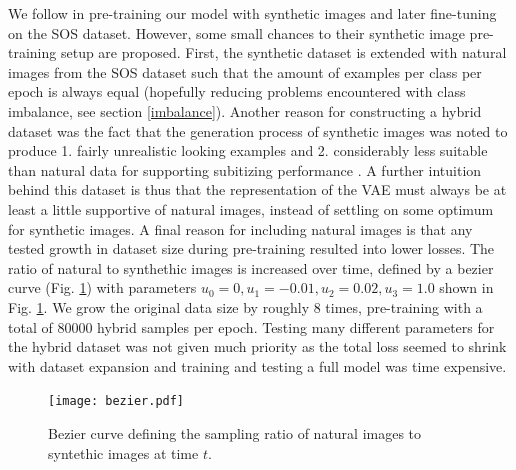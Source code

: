 \documentclass[twocolumn]{article}
\begin{document}
We follow \citet{zhang2016salient} in pre-training our model with
synthetic images and later fine-tuning on the SOS dataset. However, some
small chances to their synthetic image pre-training setup are proposed.
First, the synthetic dataset is extended with natural images from the
SOS dataset such that the amount of examples per class per epoch is
always equal (hopefully reducing problems encountered with class
imbalance, see section \ref{imbalance}). Another
reason for constructing a hybrid dataset was the fact that the
generation process of synthetic images was noted to produce 1. fairly
unrealistic looking examples and 2. considerably less suitable than
natural data for supporting subitizing performance
\citep{zhang2016salient}. A further intuition behind this dataset is
thus that the representation of the VAE must always be at least a little
supportive of natural images, instead of settling on some optimum for
synthetic images. A final reason for including natural images is that
any tested growth in dataset size during pre-training resulted into
lower losses. 
The ratio of natural to synthethic images is increased
over time, defined by a bezier curve (Fig. \ref{fig:bezier}) with parameters
\(u_0=0, u_1=-0.01, u_2=0.02, u_3=1.0\) shown in Fig. \ref{fig:bezier}. We grow the
original data size by roughly 8 times, pre-training with a total of
80000 hybrid samples per epoch. Testing many different parameters for
the hybrid dataset was not given much priority as the total loss seemed
to shrink with dataset expansion and training and testing a full model
was time expensive.


\begin{figure}
\centering
\texttt{[image: bezier.pdf]}
\caption{Bezier curve defining the sampling ratio of natural images to syntethic images at time \(t\).}
\label{fig:bezier}
\end{figure}
\end{document}
